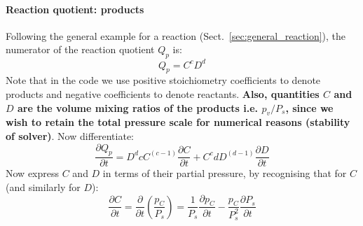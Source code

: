 \paragraph{Reaction quotient: products}
Following the general example for a reaction (Sect.~\ref{sec:general_reaction}), the numerator of the reaction quotient $Q_p$ is:
\begin{equation}
Q_p = C^c D^d
\end{equation}
Note that in the code we use positive stoichiometry coefficients to denote products and negative coefficients to denote reactants.  \textbf{Also, quantities $C$ and $D$ are the volume mixing ratios of the products i.e. $p_v/P_s$, since we wish to retain the total pressure scale for numerical reasons (stability of solver)}.  Now differentiate:
\begin{equation}
\frac{\partial Q_p}{\partial t} = D^d c C^{(c-1)} \frac{\partial C}{\partial t} + C^c d D^{(d-1)} \frac{\partial D}{\partial t}
\end{equation}
Now express $C$ and $D$ in terms of their partial pressure, by recognising that for $C$ (and similarly for $D$):
\begin{equation}
\frac{\partial C}{\partial t} = \frac{\partial}{\partial t} \left( \frac{p_C}{P_s} \right) = \frac{1}{P_s} \frac{\partial p_C}{\partial t} - \frac{p_C}{P_s^2} \frac{\partial P_s}{\partial t}
\end{equation}
